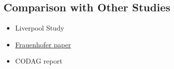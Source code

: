 \subsection{Comparison with Other Studies}
\label{subsec:appendix_other_studlies}


\begin{itemize}
    \item Liverpool Study
    \item
    \href{https://www.itwm.fraunhofer.de/de/presse-publikationen/presseinformationen/2021/2021-06-22_Dritte_Welle_Starker-Effekt-von-Schnelltests-an-Schulen.html}{Frauenhofer
    paper}
    \item CODAG report
\end{itemize}
